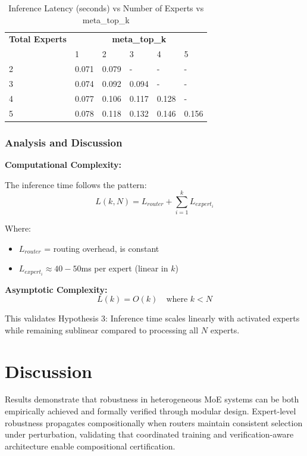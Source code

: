 \documentclass[11pt,a4paper]{article}
\begin{document}
\begin{table}[H]
\centering
\begin{tabular}{llllll}
\toprule
\textbf{Total Experts} & \multicolumn{5}{c}{\textbf{meta\_top\_k}} \\
 & 1 & 2 & 3 & 4 & 5 \\
\midrule
2 & 0.071 & 0.079 & - & - & - \\
3 & 0.074 & 0.092 & 0.094 & - & - \\
4 & 0.077 & 0.106 & 0.117 & 0.128 & - \\
5 & 0.078 & 0.118 & 0.132 & 0.146 & 0.156 \\
\bottomrule
\end{tabular}
\caption{Inference Latency (seconds) vs Number of Experts vs meta\_top\_k}
\end{table}

\subsubsection{Analysis and Discussion}

\textbf{Computational Complexity:}

The inference time follows the pattern:
\begin{equation}
    L(k, N) = L_{router} + \sum_{i=1}^k L_{expert_i}
\end{equation}

Where:
\begin{itemize}
    \item $L_{router}$ = routing overhead, is constant
    \item $L_{expert_i} \approx 40-50$ms per expert (linear in $k$)
\end{itemize}

\textbf{Asymptotic Complexity:}
\begin{equation}
    L(k) = O(k) \quad \text{where } k < N
\end{equation}

This validates Hypothesis 3: Inference time scales linearly with activated experts while remaining sublinear compared to processing all $N$ experts.

\section{Discussion}

Results demonstrate that robustness in heterogeneous MoE systems can be both empirically achieved and formally verified through modular design. Expert-level robustness propagates compositionally when routers maintain consistent selection under perturbation, validating that coordinated training and verification-aware architecture enable compositional certification.
\end{document}
